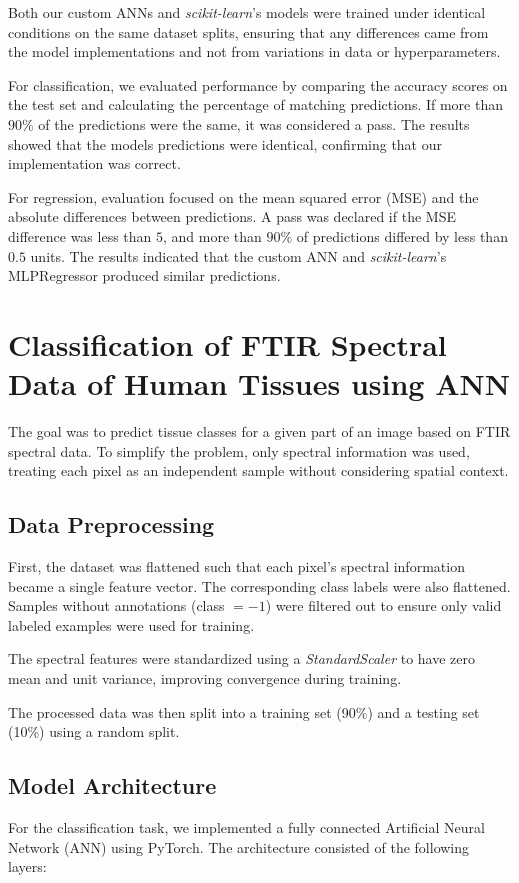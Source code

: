 \documentclass[fleqn,moreauthors,10pt]{ds_report}
\begin{document}
Both our custom ANNs and \textit{scikit-learn}'s models were trained under identical conditions on the same dataset splits, ensuring that any differences came from the model implementations and not from variations in data or hyperparameters.

For classification, we evaluated performance by comparing the accuracy scores on the test set and calculating the percentage of matching predictions. If more than \(90\%\) of the predictions were the same, it was considered a pass. The results showed that the models predictions were identical, confirming that our implementation was correct.

For regression, evaluation focused on the mean squared error (MSE) and the absolute differences between predictions. A pass was declared if the MSE difference was less than \(5\), and more than \(90\%\) of predictions differed by less than \(0.5\) units. The results indicated that the custom ANN and \textit{scikit-learn}'s MLPRegressor produced similar predictions.



\section{Classification of FTIR Spectral Data of Human Tissues using ANN}

The goal was to predict tissue classes for a given part of an image based on FTIR spectral data. To simplify the problem, only spectral information was used, treating each pixel as an independent sample without considering spatial context.


\subsection{Data Preprocessing}
First, the dataset was flattened such that each pixel's spectral information became a single feature vector. The corresponding class labels were also flattened. Samples without annotations (class $=-1$) were filtered out to ensure only valid labeled examples were used for training.

The spectral features were standardized using a \textit{StandardScaler} to have zero mean and unit variance, improving convergence during training.

The processed data was then split into a training set (90\%) and a testing set (10\%) using a random split.

\subsection{Model Architecture}
For the classification task, we implemented a fully connected Artificial Neural Network (ANN) using PyTorch. The architecture consisted of the following layers:
\end{document}
